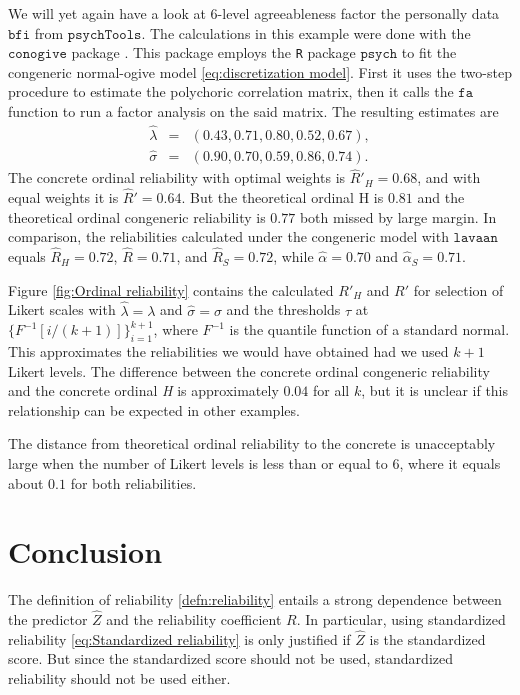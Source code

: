 \documentclass[twoside]{article}
\begin{document}
\begin{example}
We will yet again have a look at $6$-level agreeableness factor the
personally data $\mathtt{bfi}$ from $\mathtt{psychTools}$. The calculations in this example were done with the $\mathtt{conogive}$ package \citep{conogive}. This package employs the \texttt{R} package $\mathtt{psych}$ \citep{psych} to fit the congeneric normal-ogive
model \eqref{eq:discretization model}. First it uses the two-step procedure
to estimate the polychoric correlation matrix, then it calls the $\mathtt{fa}$ function to run a factor analysis on the said matrix.
The resulting estimates are 
\begin{eqnarray*}
\hat{\lambda} & = & (0.43,0.71,0.80,0.52,0.67),\\
\hat{\sigma} & = & (0.90,0.70,0.59,0.86,0.74).
\end{eqnarray*} The concrete ordinal reliability
with optimal weights is $\hat{R}'_{H}=0.68$, and with equal weights
it is $\hat{R}'=0.64$. But the theoretical ordinal H is $0.81$ 
and the theoretical ordinal congeneric reliability is $0.77$ both missed by large margin. In comparison, the
reliabilities calculated under the congeneric model with $\mathtt{lavaan}$ \citep{Rosseel2012-yg}
equals $\hat{R}_{H}=0.72$, $\hat{R}=0.71$, and $\hat{R}_S = 0.72$, while $\hat{\alpha} = 0.70$ and $\hat{\alpha}_S = 0.71$.

Figure \ref{fig:Ordinal reliability} contains the calculated $ R'_{H}$ and $ R'$ for selection of Likert
scales with $\hat{\lambda} = \lambda$ and $\hat{\sigma}=\sigma$ and
the thresholds $\tau$ at $\{F^{-1}[i/(k+1)]\}_{i=1}^{k+1}$, where $F^{-1}$ is the quantile function of a standard normal. This
approximates the reliabilities we would have obtained had we used
$k+1$ Likert levels. The difference between the concrete ordinal congeneric reliability and the concrete ordinal \textit{H} is approximately $0.04$ for all $k$, but it is unclear if this relationship can be expected in other examples.

The distance from theoretical ordinal reliability to the concrete is unacceptably large when the number of Likert levels is less than or equal to $6$, where it equals about $0.1$ for both reliabilities. 
\end{example}


\section{Conclusion}
The definition of reliability \eqref{defn:reliability} entails a strong dependence between the predictor $\hat{Z}$ and the reliability coefficient $ R$. In particular, using standardized reliability \eqref{eq:Standardized reliability} is only justified if $\hat{Z}$ is the standardized score. But since the standardized score should not be used, standardized reliability should not be used either.
\end{document}
